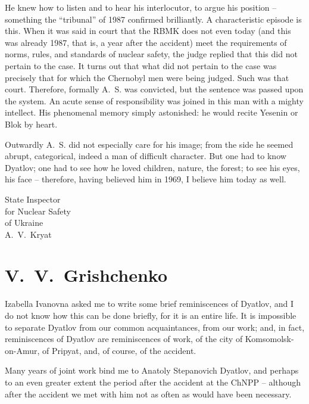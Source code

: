 \documentclass[openright]{bookest}
\begin{document}
He knew how to listen and to hear his interlocutor, to argue his position -- something the ``tribunal'' of 1987 confirmed brilliantly. A characteristic episode is this. When it was said in court that the RBMK does not even today (and this was already 1987, that is, a year after the accident) meet the requirements of norms, rules, and standards of nuclear safety, the judge replied that this did not pertain to the case. It turns out that what did not pertain to the case was precisely that for which the Chernobyl men were being judged. Such was that court. Therefore, formally A.~S. was convicted, but the sentence was passed upon the system. An acute sense of responsibility was joined in this man with a mighty intellect. His phenomenal memory simply astonished: he would recite Yesenin or Blok by heart.

Outwardly A.~S. did not especially care for his image; from the side he seemed abrupt, categorical, indeed a man of difficult character. But one had to know Dyatlov; one had to see how he loved children, nature, the forest; to see his eyes, his face -- therefore, having believed him in 1969, I believe him today as well.

\begin{flushright}
State Inspector\\
for Nuclear Safety\\
of Ukraine\\[0.5\baselineskip]
A.~V.~Kryat
\end{flushright}

\section*{V.~V.~Grishchenko}

Izabella Ivanovna asked me to write some brief reminiscences of Dyatlov, and I do not know how this can be done briefly, for it is an entire life. It is impossible to separate Dyatlov from our common acquaintances, from our work; and, in fact, reminiscences of Dyatlov are reminiscences of work, of the city of Komsomolsk-on-Amur, of Pripyat, and, of course, of the accident.

Many years of joint work bind me to Anatoly Stepanovich Dyatlov, and perhaps to an even greater extent the period after the accident at the ChNPP -- although after the accident we met with him not as often as would have been necessary.
\end{document}
